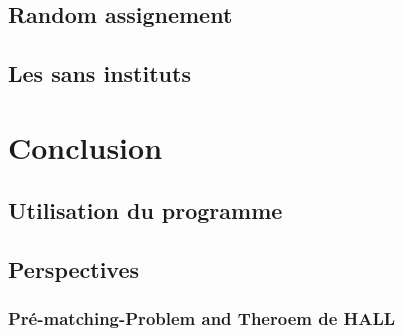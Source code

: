 \documentclass[12pt,titlepage]{article}
\begin{document}
\subsection{Random assignement}

\subsection{Les sans instituts}

\section{Conclusion}

\subsection{Utilisation du programme}


\subsection{Perspectives}

\subsubsection{Pré-matching-Problem and Theroem de HALL}
\end{document}
